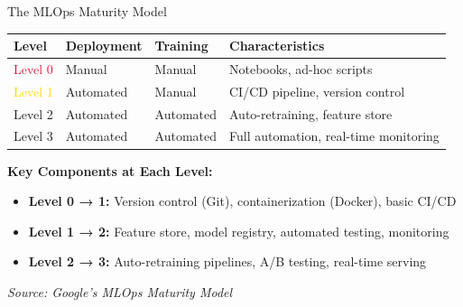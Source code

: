 \begin{frame}{The MLOps Maturity Model}
\begin{table}
\centering
\small
\begin{tabular}{p{1.8cm}p{2.5cm}p{3cm}p{3.5cm}}
\toprule
\textbf{Level} & \textbf{Deployment} & \textbf{Training} & \textbf{Characteristics} \\
\midrule
\textcolor{crimson}{Level 0} & Manual & Manual & Notebooks, ad-hoc scripts \\
\midrule
\textcolor{gold}{Level 1} & Automated & Manual & CI/CD pipeline, version control \\
\midrule
\textcolor{forest}{Level 2} & Automated & Automated & Auto-retraining, feature store \\
\midrule
\textcolor{navyblue}{Level 3} & Automated & Automated & Full automation, real-time monitoring \\
\bottomrule
\end{tabular}
\end{table}

\vspace{0.3cm}
\textbf{Key Components at Each Level:}
\begin{itemize}
\item \textbf{Level 0 → 1:} Version control (Git), containerization (Docker), basic CI/CD
\item \textbf{Level 1 → 2:} Feature store, model registry, automated testing, monitoring
\item \textbf{Level 2 → 3:} Auto-retraining pipelines, A/B testing, real-time serving
\end{itemize}

\vspace{0.2cm}
\small\textit{Source: Google's MLOps Maturity Model \cite{google2021mlops}}
\end{frame}

